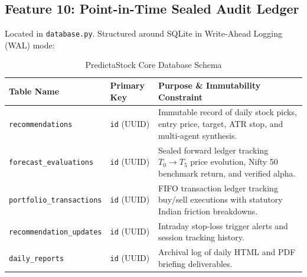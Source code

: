 \documentclass[11pt,a4paper]{article}
\begin{document}
\subsection{Feature 10: Point-in-Time Sealed Audit Ledger}
Located in \texttt{database.py}. Structured around SQLite in Write-Ahead Logging (WAL) mode:
\begin{table}[h!]
\centering
\small
\begin{tabularx}{\textwidth}{llX}
\toprule
\textbf{Table Name} & \textbf{Primary Key} & \textbf{Purpose \& Immutability Constraint} \\
\midrule
\texttt{recommendations} & \texttt{id} (UUID) & Immutable record of daily stock picks, entry price, target, ATR stop, and multi-agent synthesis. \\
\texttt{forecast\_evaluations} & \texttt{id} (UUID) & Sealed forward ledger tracking $T_0 \to T_5$ price evolution, Nifty 50 benchmark return, and verified alpha. \\
\texttt{portfolio\_transactions} & \texttt{id} (UUID) & FIFO transaction ledger tracking buy/sell executions with statutory Indian friction breakdowns. \\
\texttt{recommendation\_updates} & \texttt{id} (UUID) & Intraday stop-loss trigger alerts and session tracking history. \\
\texttt{daily\_reports} & \texttt{id} (UUID) & Archival log of daily HTML and PDF briefing deliverables. \\
\bottomrule
\end{tabularx}
\caption{PredictaStock Core Database Schema}
\end{table}
\end{document}
